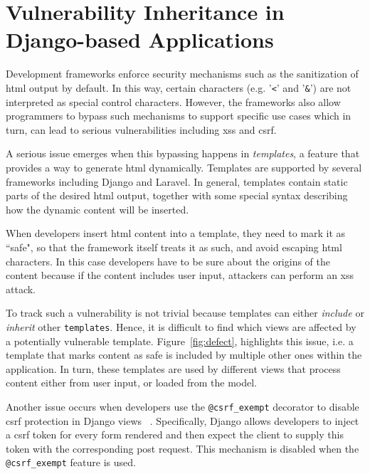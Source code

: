 
\section{Vulnerability Inheritance in Django-based Applications}
\label{sec:motivation}
\vspace{-0.5mm}

Development frameworks enforce security mechanisms such as the 
sanitization of {\sc html} output by default.
In this way, certain characters
(e.g. '{\tt <}' and '{\tt \&}')
are not interpreted as special
control characters.
However,
the frameworks also
allow programmers to
bypass such mechanisms to support
specific use cases which 
in turn, can lead to serious
vulnerabilities including {\sc xss} and {\sc csrf}.

A serious issue emerges when this bypassing
happens in {\it templates}, 
a feature that provides a way to generate {\sc html} dynamically.
Templates are supported by several frameworks
including Django and Laravel.
In general,
templates contain static parts of the 
desired {\sc html} output,
together with some special 
syntax describing how the dynamic
content will be inserted.

When developers insert
{\sc html} content into a template,
they need to mark it as ``safe", 
so that the framework itself
treats it as such, 
and avoid escaping {\sc html} characters.
In this case developers have to be sure about the
origins of the content
because if the content 
includes user input,
attackers can perform an 
{\sc xss} attack.

To track such a vulnerability is not trivial
because templates can either
{\it include} or {\it inherit}
other {\tt templates}.
Hence,
it is difficult to find which
views are affected
by a potentially vulnerable template.
Figure~\ref{fig:defect},
highlights this issue,
i.e. a template that marks content
as safe is included by multiple other
ones within the application.
In turn, 
these templates are used by different 
views that process content either from user 
input, or loaded from the model. 

Another issue occurs when
developers use the 
{\tt @csrf\_exempt} decorator to disable 
{\sc csrf} protection in Django
views ~\cite{csrf_exempt}.
Specifically,
Django allows developers to
inject a {\sc csrf} token 
for every form rendered and then
expect the client 
to supply this token with the
corresponding {\sc post}  request.
This mechanism is disabled when the {\tt @csrf\_exempt} 
feature is used.


